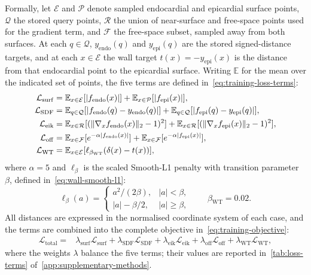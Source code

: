 Formally, let $\mathcal{E}$ and $\mathcal{P}$ denote sampled endocardial and
epicardial surface points, $\mathcal{Q}$ the stored query points,
$\mathcal{R}$ the union of near-surface and free-space points used for the
gradient term, and $\mathcal{F}$ the free-space subset, sampled away from both
surfaces. At each
$q\in\mathcal{Q}$, $y_{\mathrm{endo}}(q)$ and $y_{\mathrm{epi}}(q)$ are the
stored signed-distance targets, and at each $x\in\mathcal{E}$ the wall target
$t(x)=-y_{\mathrm{epi}}(x)$ is the distance from that endocardial point to the
epicardial surface. Writing $\mathbb{E}$ for the mean over the indicated set
of points, the five terms are defined in~\cref{eq:training-loss-terms}:
\begin{align}
	\mathcal{L}_{\mathrm{surf}} ={}&
	\mathbb{E}_{x\in\mathcal{E}}[|f_{\mathrm{endo}}(x)|]
	+ \mathbb{E}_{x\in\mathcal{P}}[|f_{\mathrm{epi}}(x)|], \notag \\
	\mathcal{L}_{\mathrm{SDF}} ={}&
	\mathbb{E}_{q\in\mathcal{Q}}[|f_{\mathrm{endo}}(q)-y_{\mathrm{endo}}(q)|]
	+ \mathbb{E}_{q\in\mathcal{Q}}[|f_{\mathrm{epi}}(q)-y_{\mathrm{epi}}(q)|], \notag \\
	\mathcal{L}_{\mathrm{eik}} ={}&
	\mathbb{E}_{x\in\mathcal{R}}[(\lVert\nabla_x f_{\mathrm{endo}}(x)\rVert_2-1)^2]
	+ \mathbb{E}_{x\in\mathcal{R}}[(\lVert\nabla_x f_{\mathrm{epi}}(x)\rVert_2-1)^2], \notag \\
	\mathcal{L}_{\mathrm{off}} ={}&
	\mathbb{E}_{x\in\mathcal{F}}[e^{-\alpha|f_{\mathrm{endo}}(x)|}]
	+ \mathbb{E}_{x\in\mathcal{F}}[e^{-\alpha|f_{\mathrm{epi}}(x)|}], \notag \\
	\mathcal{L}_{\mathrm{WT}} ={}&
	\mathbb{E}_{x\in\mathcal{E}}[\ell_{\beta_{\mathrm{WT}}}(\delta(x)-t(x))],
	\label{eq:training-loss-terms}
\end{align}
where $\alpha=5$ and $\ell_{\beta}$ is the scaled Smooth-L1 penalty with
transition parameter $\beta$, defined in~\cref{eq:wall-smooth-l1}:
\begin{equation}
	\ell_{\beta}(a)=
	\begin{cases}
		a^2/(2\beta), & |a|<\beta, \\
		|a|-\beta/2, & |a|\geq\beta,
	\end{cases}
	\qquad \beta_{\mathrm{WT}}=0.02.
	\label{eq:wall-smooth-l1}
\end{equation}
All distances are expressed in the normalised coordinate system of each case,
and the terms are combined into the complete objective in~\cref{eq:training-objective}:
\begin{align}
	\mathcal{L}_{\mathrm{total}} ={}&
	\lambda_{\mathrm{surf}}\mathcal{L}_{\mathrm{surf}} +
	\lambda_{\mathrm{SDF}}\mathcal{L}_{\mathrm{SDF}} +
	\lambda_{\mathrm{eik}}\mathcal{L}_{\mathrm{eik}} +
	\lambda_{\mathrm{off}}\mathcal{L}_{\mathrm{off}} +
	\lambda_{\mathrm{WT}}\mathcal{L}_{\mathrm{WT}},
	\label{eq:training-objective}
\end{align}
where the weights $\lambda$ balance the five terms; their values are reported
in~\cref{tab:loss-terms} of~\cref{app:supplementary-methods}.

